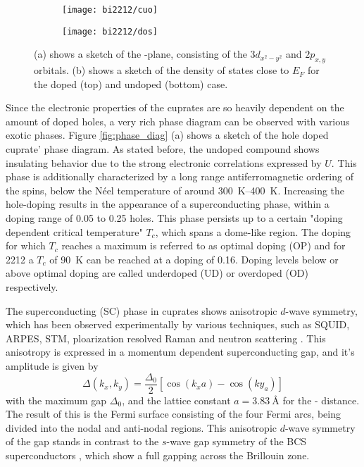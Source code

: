 \begin{figure}[t]
	\centering
	\begin{subfigure}[b]{0.49\textwidth}
		\texttt{[image: bi2212/cuo]}
		\caption{}
	\end{subfigure}
	\begin{subfigure}[b]{0.45\textwidth}
		\texttt{[image: bi2212/dos]}
		\caption{}
	\end{subfigure}
	\caption{(a) shows a sketch of the -plane, consisting of the  $3d_{x^2-y^2}$ and  $2p_{x,y}$ orbitals. (b) shows a sketch of the density of states close to $E_F$ for the doped (top) and undoped (bottom) case.}
	\label{fig:cuo_dos}
\end{figure}

Since the electronic properties of the cuprates are so heavily dependent on the amount of doped holes, a very rich phase diagram can be observed with various exotic phases.
Figure \ref{fig:phase_diag} (a) shows a sketch of the hole doped cuprate' phase diagram.
As stated before, the undoped compound shows insulating behavior due to the strong electronic correlations expressed by $U$.
This phase is additionally characterized by a long range antiferromagnetic ordering of the spins, below the Néel temperature of around \qtyrange{300}{400}{\kelvin}.
Increasing the hole-doping results in the appearance of a superconducting phase, within a doping range of 0.05 to 0.25 holes.
This phase persists up to a certain "doping dependent critical temperature" $T_c$, which spans a dome-like region.
The doping for which $T_c$ reaches a maximum is referred to as optimal doping (OP) and for 2212 a $T_c$ of \qty{90}{\kelvin} can be reached at a doping of 0.16.
Doping levels below or above optimal doping are called underdoped (UD) or overdoped (OD) respectively.

The superconducting (SC) phase in cuprates shows anisotropic $d$-wave symmetry, which has been observed experimentally by various techniques, such as SQUID, ARPES, STM, ploarization resolved Raman and neutron scattering \cite{wollman_experimental_1993,tsuei_pairing_1994,tsuei_pairing_1996,shen_anomalously_1993,ding_angle-resolved_1996,chen_unconventional_2022,renner_vacuum_1995,pan_microscopic_2001,gu_directly_2019,devereaux_electronic_1994,sacuto_nodes_1997,fong_neutron_1999}.
This anisotropy is expressed in a momentum dependent superconducting gap, and it's amplitude is given by
\begin{equation}
	\Delta(k_x,k_y) = \frac{\Delta_0}{2}\left[\cos(k_xa)-\cos(ky_a)\right]
\end{equation}
with the maximum gap $\Delta_0$, and the lattice constant $a=\qty{3.83}{\angstrom}$ for the - distance.
The result of this is the Fermi surface consisting of the four Fermi arcs, being divided into the nodal and anti-nodal regions.
This anisotropic $d$-wave symmetry of the gap stands in contrast to the $s$-wave gap symmetry of the BCS superconductors \cite{bardeen_theory_1957}, which show a full gapping across the Brillouin zone.

